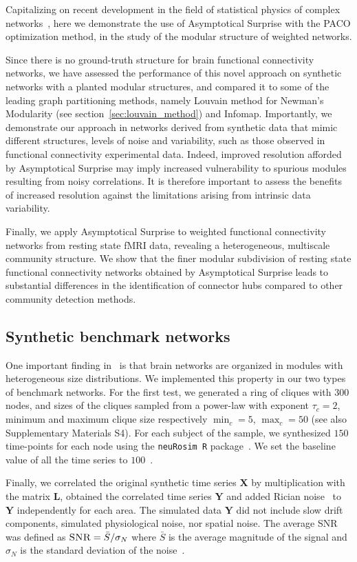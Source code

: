 Capitalizing on recent development in the field of statistical physics of complex networks~\cite{traag2015}, here we demonstrate the use of Asymptotical Surprise with the PACO optimization method, in the study of the modular structure of weighted networks.

Since there is no ground-truth structure for brain functional connectivity networks, we have assessed the performance of this novel approach on synthetic networks with a planted modular structures, and compared it to some of the leading graph partitioning methods, namely Louvain method for Newman's Modularity (see section~\ref{sec:louvain_method}) and Infomap.
Importantly, we demonstrate our approach in networks  derived from synthetic data that mimic different structures, levels of noise and variability, such as those observed in functional connectivity experimental data.
Indeed, improved resolution afforded by Asymptotical Surprise may imply increased vulnerability to spurious modules resulting from noisy correlations.
It is therefore important to assess the benefits of increased resolution against the limitations arising from intrinsic data variability. 

Finally, we apply Asymptotical Surprise to weighted functional connectivity networks from resting state fMRI data, revealing a heterogeneous, multiscale community structure. We show that the finer modular subdivision of resting state functional connectivity networks obtained by Asymptotical Surprise leads to substantial differences in the identification of connector hubs compared to other community detection methods.

\subsection{Synthetic benchmark networks}
One important finding in~\cite{nicolini2016} is that brain networks are organized in modules with heterogeneous size distributions.
We implemented this property in our two types of benchmark networks.
For the first test, we generated a ring of cliques with $300$ nodes, and sizes of the cliques sampled from a power-law with exponent $\tau_c=2$, minimum and maximum clique size respectively $\min_c=5$, $\max_c=50$ (see also Supplementary Materials S4).
For each subject of the sample, we synthesized $150$ time-points for each node using the \texttt{neuRosim R} package~\cite{neurosim2011}.
We set the baseline value of all the time series to $100$~\cite{welvaert2013}.

Finally, we correlated the original synthetic time series $\mathbf{X}$ by multiplication with the matrix $\mathbf{L}$, obtained the correlated time series $\mathbf{Y}$ and added Rician noise~\cite{Gudbjartsson1995} to $\mathbf{Y}$ independently for each area. The simulated data $\mathbf{Y}$ did not include slow drift components, simulated physiological noise, nor spatial noise. The average SNR was defined as $\textsc{SNR}=\bar{S}/\sigma_N$ where $\bar{S}$ is the average magnitude of the signal and $\sigma_N$ is the standard deviation of the noise~\cite{kruger2011}.

